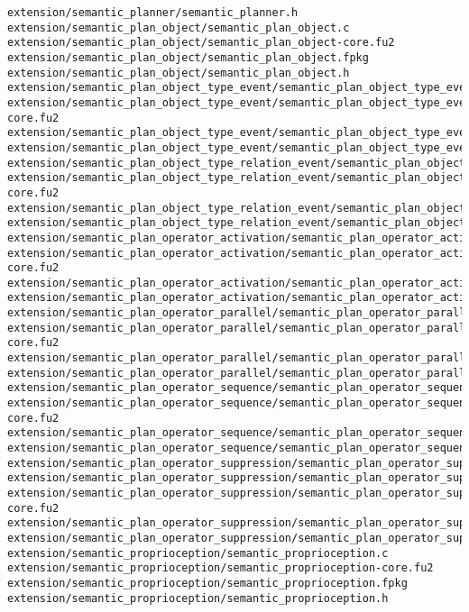 \begin{lstlisting}
extension/semantic_planner/semantic_planner.h
extension/semantic_plan_object/semantic_plan_object.c
extension/semantic_plan_object/semantic_plan_object-core.fu2
extension/semantic_plan_object/semantic_plan_object.fpkg
extension/semantic_plan_object/semantic_plan_object.h
extension/semantic_plan_object_type_event/semantic_plan_object_type_event.c
extension/semantic_plan_object_type_event/semantic_plan_object_type_event-core.fu2
extension/semantic_plan_object_type_event/semantic_plan_object_type_event.fpkg
extension/semantic_plan_object_type_event/semantic_plan_object_type_event.h
extension/semantic_plan_object_type_relation_event/semantic_plan_object_type_relation_event.c
extension/semantic_plan_object_type_relation_event/semantic_plan_object_type_relation_event-core.fu2
extension/semantic_plan_object_type_relation_event/semantic_plan_object_type_relation_event.fpkg
extension/semantic_plan_object_type_relation_event/semantic_plan_object_type_relation_event.h
extension/semantic_plan_operator_activation/semantic_plan_operator_activation.c
extension/semantic_plan_operator_activation/semantic_plan_operator_activation-core.fu2
extension/semantic_plan_operator_activation/semantic_plan_operator_activation.fpkg
extension/semantic_plan_operator_activation/semantic_plan_operator_activation.h
extension/semantic_plan_operator_parallel/semantic_plan_operator_parallel.c
extension/semantic_plan_operator_parallel/semantic_plan_operator_parallel-core.fu2
extension/semantic_plan_operator_parallel/semantic_plan_operator_parallel.fpkg
extension/semantic_plan_operator_parallel/semantic_plan_operator_parallel.h
extension/semantic_plan_operator_sequence/semantic_plan_operator_sequence.c
extension/semantic_plan_operator_sequence/semantic_plan_operator_sequence-core.fu2
extension/semantic_plan_operator_sequence/semantic_plan_operator_sequence.fpkg
extension/semantic_plan_operator_sequence/semantic_plan_operator_sequence.h
extension/semantic_plan_operator_suppression/semantic_plan_operator_suppession.fpkg
extension/semantic_plan_operator_suppression/semantic_plan_operator_suppression.c
extension/semantic_plan_operator_suppression/semantic_plan_operator_suppression-core.fu2
extension/semantic_plan_operator_suppression/semantic_plan_operator_suppression.fpkg
extension/semantic_plan_operator_suppression/semantic_plan_operator_suppression.h
extension/semantic_proprioception/semantic_proprioception.c
extension/semantic_proprioception/semantic_proprioception-core.fu2
extension/semantic_proprioception/semantic_proprioception.fpkg
extension/semantic_proprioception/semantic_proprioception.h

\end{lstlisting}

